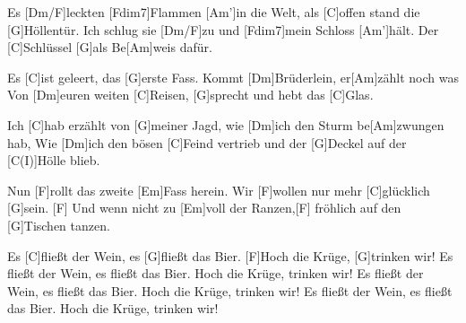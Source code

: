 \begin{guitar}
	Es [Dm/F]leckten [Fdim7]Flammen [Am']in die Welt, als [C]offen stand die [G]Höllentür.
	Ich schlug sie [Dm/F]zu und [Fdim7]mein Schloss [Am']hält. Der [C]Schlüssel [G]als Be[Am]weis dafür.
	
	\begin{highlightbar}
		Es [C]ist geleert, das [G]erste Fass. Kommt [Dm]Brüderlein, er[Am]zählt noch was
		Von [Dm]euren weiten [C]Reisen, [G]sprecht und hebt das [C]Glas.
	\end{highlightbar}
	
	Ich [C]hab erzählt von [G]meiner Jagd, wie [Dm]ich den Sturm be[Am]zwungen hab,
	Wie [Dm]ich den bösen [C]Feind vertrieb und der [G]Deckel auf der [C(I)]Hölle blieb.
	
	Nun [F]rollt das zweite [Em]Fass herein. Wir [F]wollen nur mehr [C]glücklich [G]sein.
	[F] Und wenn nicht zu [Em]voll der Ranzen,[F] fröhlich auf den [G]Tischen tanzen.
	
	Es [C]fließt der Wein, es [G]fließt das Bier. [F]Hoch die Krüge, [G]trinken wir!
	Es fließt der Wein, es fließt das Bier. Hoch die Krüge, trinken wir!
	Es fließt der Wein, es fließt das Bier. Hoch die Krüge, trinken wir!
	Es fließt der Wein, es fließt das Bier. Hoch die Krüge, trinken wir!
\end{guitar}




